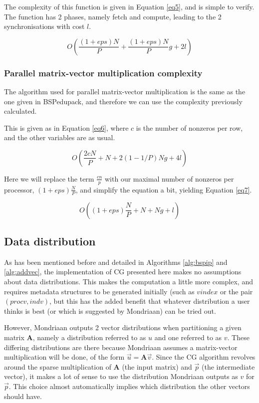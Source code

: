 \documentclass[a4paper]{article}
\newcommand{\ve}[1]{\ensuremath{\vec{#1}}}
\newcommand{\mat}[1]{\ensuremath{\boldsymbol{#1}}}
\begin{document}
The complexity of this function is given in Equation \ref{eq5}, and
is simple to verify. The function has 2 phases, namely fetch and compute, leading to the 2 synchronisations with cost $l$.

\begin{equation}
    O( \frac{(1+eps)N}{P}  + \frac{(1+eps)N}{P} g + 2l)
    \label{eq5}
\end{equation}
\subsubsection{Parallel matrix-vector multiplication complexity}

The algorithm used for parallel matrix-vector multiplication is
the same as the one given in BSPedupack, and therefore we can
use the complexity previously calculated\cite{bisseling2004parallel}.

This is given as in Equation \ref{eq6}, where $c$ is the number of
nonzeros per row, and the other variables are as usual.

\begin{equation}
    O(\frac{2cN}{P} + N + 2(1-1/P)Ng + 4l)
    \label{eq6}
\end{equation}

Here we will replace the term $\frac{cn}{p}$ with our maximal number of
nonzeros per processor, $(1+eps) \frac{N}{P}$, and simplify the equation
a bit, yielding Equation \ref{eq7}.

\begin{equation}
    O( (1+eps)\frac{N}{P}  + N + Ng + l  )
    \label{eq7}
\end{equation}


\subsection{Data distribution}\label{sec:data-distribition}

As has been mentioned before and detailed in Algorithms \ref{alg:bspip} and \ref{alg:addvec}, the
implementation of CG presented here makes no assumptions about data distributions. This makes
the computation a little more complex, and requires metadata structures to be generated initially
(such as $vindex$ or the pair $(procv,indv)$, but this has the added benefit that whatever
distribution a user thinks is best (or which is suggested by Mondriaan) can be tried out.

However, Mondriaan outputs 2 vector distributions when partitioning a given matrix \mat A, namely
a distribution referred to as $u$ and one referred to as $v$. These differing distributions are
there because Mondriaan assumes a matrix-vector multiplication will be done, of the form $\ve u = \mat A \ve v$. Since the CG algorithm revolves around the sparse multiplication of \mat A (the input matrix) and
\ve p (the intermediate vector), it makes a lot of sense to use the distribution Mondriaan outputs as $v$ for \ve p. This choice almost automatically implies which distribution the other vectors should have.
\end{document}
